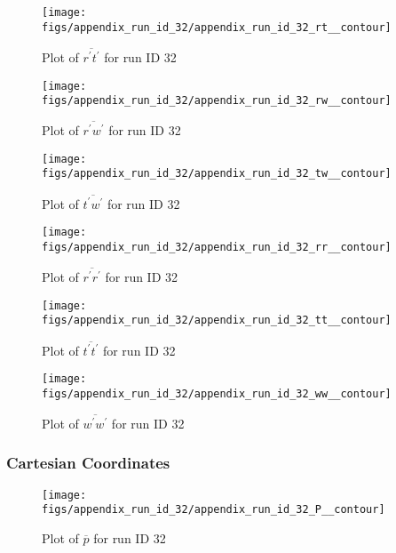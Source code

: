 \begin{figure}[H]
\centering
\texttt{[image: figs/appendix\_run\_id\_32/appendix\_run\_id\_32\_rt\_\_contour]}
\caption{Plot of $\overline{r^\prime t^\prime}$ for run ID 32}
\label{fig:appendix_run_id_32_rt__contour}
\end{figure}


\begin{figure}[H]
\centering
\texttt{[image: figs/appendix\_run\_id\_32/appendix\_run\_id\_32\_rw\_\_contour]}
\caption{Plot of $\overline{r^\prime w^\prime}$ for run ID 32}
\label{fig:appendix_run_id_32_rw__contour}
\end{figure}


\begin{figure}[H]
\centering
\texttt{[image: figs/appendix\_run\_id\_32/appendix\_run\_id\_32\_tw\_\_contour]}
\caption{Plot of $\overline{t^\prime w^\prime}$ for run ID 32}
\label{fig:appendix_run_id_32_tw__contour}
\end{figure}


\begin{figure}[H]
\centering
\texttt{[image: figs/appendix\_run\_id\_32/appendix\_run\_id\_32\_rr\_\_contour]}
\caption{Plot of $\overline{r^\prime r^\prime}$ for run ID 32}
\label{fig:appendix_run_id_32_rr__contour}
\end{figure}


\begin{figure}[H]
\centering
\texttt{[image: figs/appendix\_run\_id\_32/appendix\_run\_id\_32\_tt\_\_contour]}
\caption{Plot of $\overline{t^\prime t^\prime}$ for run ID 32}
\label{fig:appendix_run_id_32_tt__contour}
\end{figure}


\begin{figure}[H]
\centering
\texttt{[image: figs/appendix\_run\_id\_32/appendix\_run\_id\_32\_ww\_\_contour]}
\caption{Plot of $\overline{w^\prime w^\prime}$ for run ID 32}
\label{fig:appendix_run_id_32_ww__contour}
\end{figure}


\subsubsection{Cartesian Coordinates}
\begin{figure}[H]
\centering
\texttt{[image: figs/appendix\_run\_id\_32/appendix\_run\_id\_32\_P\_\_contour]}
\caption{Plot of $\overline{p}$ for run ID 32}
\label{fig:appendix_run_id_32_P__contour}
\end{figure}



